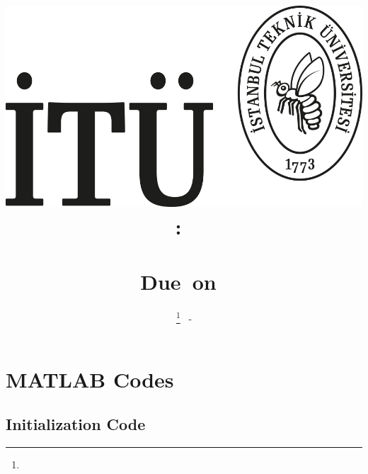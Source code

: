 \documentclass[12pt]{article}
\title{
	\includegraphics[width=0.5\linewidth]{./fig/itu_logo}\\	
	\vspace{.5in}
	\LARGE{\textbf{\hmwkClass:\ \hmwkTitle}}\\
	\Large{\textbf{\hmwkCRN}}\\
	\normalsize\vspace{0.1in}\small{Due\ on\ \hmwkDueDate}\\
	\vspace{0.1in}\large{\textit{\hmwkClassInstructor}}
	\vspace{1in}
}
\author{
	\textbf{\hmwkAuthorNameI}\thanks{\hmwkAuthorEmailI} \ - \textbf{\hmwkAuthorIDI} \\
	}
\date{} %
\begin{document}
\maketitle



\newpage
\thispagestyle{empty} %
\tableofcontents
\newpage 
{} 














\newpage




\newpage
\appendix

\section{MATLAB Codes}

\subsection{Initialization Code} \label{App_Int}


\end{document}

